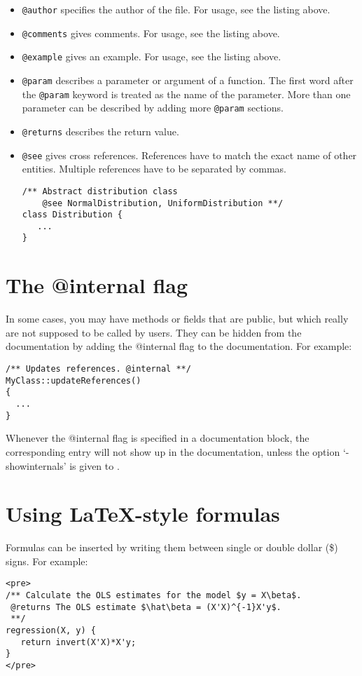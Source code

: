 \begin{itemize}
\item {\tt @author} specifies the author of the file. For  usage, see the listing above.

\item {\tt @comments} gives comments. For usage, see the listing above.

\item {\tt @example} gives an example. For usage, see the listing above.

\item {\tt @param} describes a parameter or argument of a function. The 
first word after the {\tt @param} keyword is treated as the name of the 
parameter. More than one parameter can be described by adding more {\tt @param} sections.

\item {\tt @returns} describes the return value.

\item {\tt @see} gives cross references. References have to 
match the exact name of other entities. Multiple references have to be
separated by commas.
\begin{lstlisting}
/** Abstract distribution class
    @see NormalDistribution, UniformDistribution **/
class Distribution { 
   ...
}
\end{lstlisting}

\end{itemize}

\section{The @internal flag}
In some cases, you may have methods or fields that are public, but which really are not supposed to 
be called by users. They can be hidden from the documentation by adding the @internal flag to the
documentation. For example:
\begin{lstlisting}
/** Updates references. @internal **/
MyClass::updateReferences()
{
  ...
}
\end{lstlisting}
Whenever the @internal flag is specified in a documentation block, the corresponding 
entry will not show up in the documentation, unless the option `-showinternals' is given
to \oxdoc. 



\section{Using \LaTeX-style formulas}
Formulas can be inserted by writing them between single or double dollar (\$) signs. 
For example:
\begin{lstlisting}
<pre>
/** Calculate the OLS estimates for the model $y = X\beta$.
 @returns The OLS estimate $\hat\beta = (X'X)^{-1}X'y$.
 **/
regression(X, y) {
   return invert(X'X)*X'y;
}
</pre>
\end{lstlisting}


